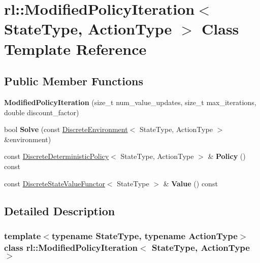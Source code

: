 \hypertarget{classrl_1_1_modified_policy_iteration}{}\section{rl\+:\+:Modified\+Policy\+Iteration$<$ State\+Type, Action\+Type $>$ Class Template Reference}
\label{classrl_1_1_modified_policy_iteration}
\subsection*{Public Member Functions}
\begin{DoxyCompactItemize}
\item 
\hypertarget{classrl_1_1_modified_policy_iteration_a541cc04f5cc477fe4229261b41eb5951}{}\label{classrl_1_1_modified_policy_iteration_a541cc04f5cc477fe4229261b41eb5951} 
{\bfseries Modified\+Policy\+Iteration} (size\+\_\+t num\+\_\+value\+\_\+updates, size\+\_\+t max\+\_\+iterations, double discount\+\_\+factor)
\item 
\hypertarget{classrl_1_1_modified_policy_iteration_ae9b2044a7baf7d0e4078b6910cc1720f}{}\label{classrl_1_1_modified_policy_iteration_ae9b2044a7baf7d0e4078b6910cc1720f} 
bool {\bfseries Solve} (const \hyperlink{classrl_1_1_discrete_environment}{Discrete\+Environment}$<$ State\+Type, Action\+Type $>$ \&environment)
\item 
\hypertarget{classrl_1_1_modified_policy_iteration_a9a52e336f2733e59581dd4cc586e137e}{}\label{classrl_1_1_modified_policy_iteration_a9a52e336f2733e59581dd4cc586e137e} 
const \hyperlink{classrl_1_1_discrete_deterministic_policy}{Discrete\+Deterministic\+Policy}$<$ State\+Type, Action\+Type $>$ \& {\bfseries Policy} () const
\item 
\hypertarget{classrl_1_1_modified_policy_iteration_a3748961e9c053571e3bf3042a50e0fad}{}\label{classrl_1_1_modified_policy_iteration_a3748961e9c053571e3bf3042a50e0fad} 
const \hyperlink{structrl_1_1_discrete_state_value_functor}{Discrete\+State\+Value\+Functor}$<$ State\+Type $>$ \& {\bfseries Value} () const
\end{DoxyCompactItemize}


\subsection{Detailed Description}
\subsubsection*{template$<$typename State\+Type, typename Action\+Type$>$\newline
class rl\+::\+Modified\+Policy\+Iteration$<$ State\+Type, Action\+Type $>$}



